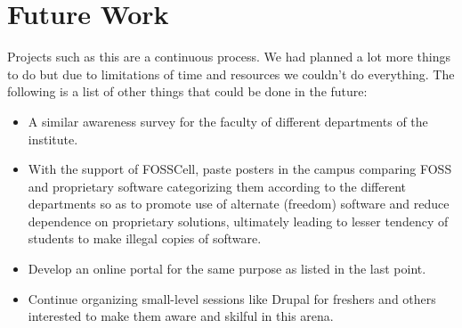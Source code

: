 \chapter{Future Work}

Projects such as this are a continuous process. We had planned a lot more things to do but due to limitations of time and resources we couldn't do everything. The following is a list of other things that could be done in the future:
\begin{itemize}
\item A similar awareness survey for the faculty of different departments of the institute.
\item With the support of FOSSCell, paste posters in the campus comparing FOSS and proprietary software categorizing them according to the different departments so as to promote use of alternate (freedom) software and reduce dependence on proprietary solutions, ultimately leading to lesser tendency of students to make illegal copies of software.
\item Develop an online portal for the same purpose as listed in the last point.
\item Continue organizing small-level sessions like Drupal for freshers and others interested to make them aware and skilful in this arena.
\end{itemize}
